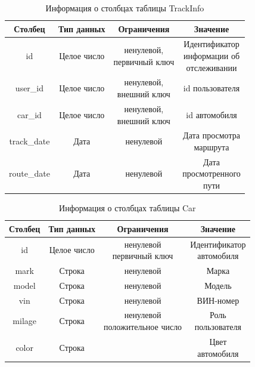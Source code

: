 \begin{table}[H]
	\begin{center}
		\caption{Информация о столбцах таблицы TrackInfo}
		\begin{tabular}{|c|c|c|c|}
			\hline
			Столбец & Тип данных & Ограничения & Значение \\
			\hline
			id & Целое число & \makecell{ненулевой, \\ первичный ключ} & \makecell{Идентификатор \\ информации об \\ отслеживании} \\
			\hline
			user\_id & Целое число & \makecell{ненулевой, \\ внешний ключ} & id пользователя \\
			\hline
			car\_id & Целое число & \makecell{ненулевой, \\ внешний ключ} & id автомобиля \\
			\hline
			track\_date & Дата & ненулевой & \makecell{Дата просмотра \\ маршрута}\\
			\hline
			route\_date & Дата & ненулевой & \makecell{Дата \\ просмотренного \\ пути}\\
			\hline
		\end{tabular}
		\label{table:db:track_info}
	\end{center}
\end{table}


\begin{table}[H]
	\begin{center}
		\caption{Информация о столбцах таблицы Car}
		\begin{tabular}{|c|c|c|c|}
			\hline
			Столбец & Тип данных & Ограничения & Значение \\
			\hline
			id & Целое число & \makecell{ненулевой \\ первичный ключ} & \makecell{Идентификатор \\ автомобиля} \\
			\hline
			mark & Строка & ненулевой & Марка \\
			\hline
			model & Строка & ненулевой & Модель \\
			\hline
			vin & Строка & ненулевой & ВИН-номер\\
			\hline
			milage & Строка & \makecell{ненулевой \\ положительное число} & \makecell{Роль \\ пользователя}\\
			\hline
			color & Строка & \makecell{ненулевой} & \makecell{Цвет \\ автомобиля} \\
			\hline
		\end{tabular}
		\label{table:db:cars}
	\end{center}
\end{table}

